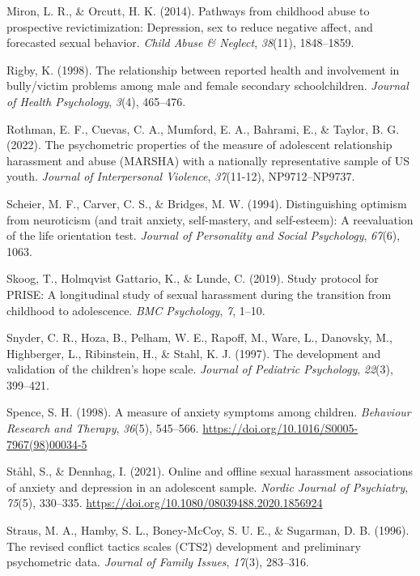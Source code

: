 \documentclass[
]{article}
\newlength{\cslhangindent}
\newenvironment{CSLReferences}[2] %
 {\begin{list}{}{%
  \setlength{\itemindent}{0pt}
  \setlength{\leftmargin}{0pt}
  \setlength{\parsep}{0pt}
  \ifodd #1
   \setlength{\leftmargin}{\cslhangindent}
   \setlength{\itemindent}{-1\cslhangindent}
  \fi
  \setlength{\itemsep}{#2\baselineskip}}}
 {\end{list}}
\begin{document}
\begin{CSLReferences}{1}{0}
Miron, L. R., \& Orcutt, H. K. (2014). Pathways from childhood abuse to
prospective revictimization: Depression, sex to reduce negative affect,
and forecasted sexual behavior. \emph{Child Abuse \& Neglect},
\emph{38}(11), 1848--1859.

Rigby, K. (1998). The relationship between reported health and
involvement in bully/victim problems among male and female secondary
schoolchildren. \emph{Journal of Health Psychology}, \emph{3}(4),
465--476.

Rothman, E. F., Cuevas, C. A., Mumford, E. A., Bahrami, E., \& Taylor,
B. G. (2022). The psychometric properties of the measure of adolescent
relationship harassment and abuse (MARSHA) with a nationally
representative sample of US youth. \emph{Journal of Interpersonal
Violence}, \emph{37}(11-12), NP9712--NP9737.

Scheier, M. F., Carver, C. S., \& Bridges, M. W. (1994). Distinguishing
optimism from neuroticism (and trait anxiety, self-mastery, and
self-esteem): A reevaluation of the life orientation test. \emph{Journal
of Personality and Social Psychology}, \emph{67}(6), 1063.

Skoog, T., Holmqvist Gattario, K., \& Lunde, C. (2019). Study protocol
for PRISE: A longitudinal study of sexual harassment during the
transition from childhood to adolescence. \emph{BMC Psychology},
\emph{7}, 1--10.

Snyder, C. R., Hoza, B., Pelham, W. E., Rapoff, M., Ware, L., Danovsky,
M., Highberger, L., Ribinstein, H., \& Stahl, K. J. (1997). The
development and validation of the children{'}s hope scale. \emph{Journal
of Pediatric Psychology}, \emph{22}(3), 399--421.

Spence, S. H. (1998). A measure of anxiety symptoms among children.
\emph{Behaviour Research and Therapy}, \emph{36}(5), 545--566.
\url{https://doi.org/10.1016/S0005-7967(98)00034-5}

Ståhl, S., \& Dennhag, I. (2021). Online and offline sexual harassment
associations of anxiety and depression in an adolescent sample.
\emph{Nordic Journal of Psychiatry}, \emph{75}(5), 330--335.
\url{https://doi.org/10.1080/08039488.2020.1856924}

Straus, M. A., Hamby, S. L., Boney-McCoy, S. U. E., \& Sugarman, D. B.
(1996). The revised conflict tactics scales (CTS2) development and
preliminary psychometric data. \emph{Journal of Family Issues},
\emph{17}(3), 283--316.


\end{CSLReferences}
\end{document}
